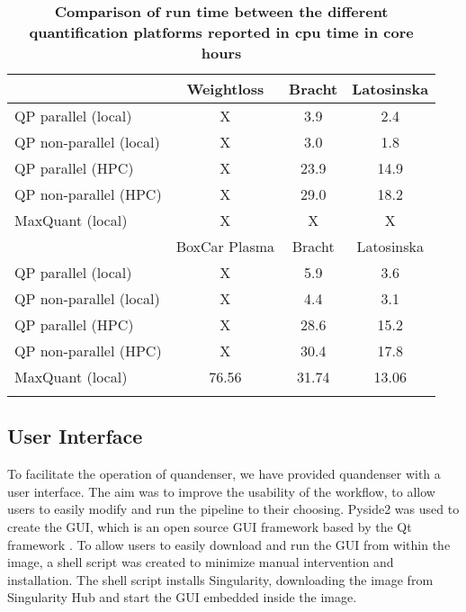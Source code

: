 \documentclass[11pt]{article}
\begin{document}
\begin{table}[!h]
  \begin{center}
  \caption{\textbf{Comparison of run time between the different quantification platforms reported in cpu time in core hours}}
  \label{table:cputime}
\begin{tabular}{lccc}

& Weightloss & Bracht & Latosinska \\ \hline \hline
QP parallel (local) & X & 3.9 & 2.4 \\
QP non-parallel (local) & X & 3.0 & 1.8 \\
QP parallel (HPC) & X & 23.9 & 14.9 \\
QP non-parallel (HPC) & X & 29.0 & 18.2 \\
MaxQuant (local) & X & X & X \\

\begin{comment}
& BoxCar Plasma & Bracht & Latosinska \\ \hline \hline
QP parallel (local) & X & 5.9 & 3.6 \\
QP non-parallel (local) & X & 4.4 & 3.1 \\
QP parallel (HPC) & X & 28.6 & 15.2 \\ %
QP non-parallel (HPC) & X & 30.4 & 17.8 \\
MaxQuant (local) & 76.56 & 31.74 & 13.06 \\
\end{comment}

\end{tabular}
\end{center}
\end{table}


\subsection*{User Interface}
To facilitate the operation of quandenser, we have provided quandenser with a user interface. The aim was to improve the usability of the workflow, to allow users to easily modify and run the pipeline to their choosing. Pyside2 was used to create the GUI, which is an open source GUI framework based by the Qt framework \cite{pyside2}. To allow users to easily download and run the GUI from within the image, a shell script was created to minimize manual intervention and installation. The shell script installs Singularity, downloading the image from Singularity Hub and start the GUI embedded inside the image.
\end{document}

